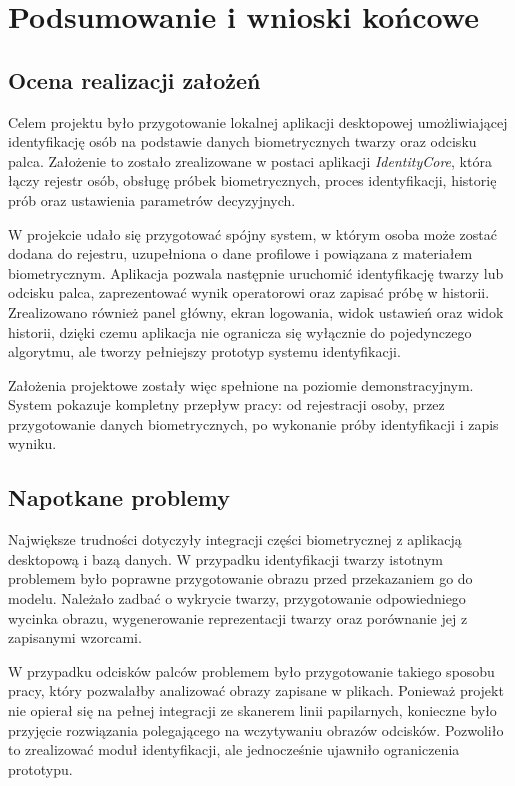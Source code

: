 \chapter{Podsumowanie i wnioski końcowe}
\label{chap:podsumowanie}

\section{Ocena realizacji założeń}

Celem projektu było przygotowanie lokalnej aplikacji desktopowej umożliwiającej identyfikację osób na podstawie danych biometrycznych twarzy oraz odcisku palca. Założenie to zostało zrealizowane w postaci aplikacji \textit{IdentityCore}, która łączy rejestr osób, obsługę próbek biometrycznych, proces identyfikacji, historię prób oraz ustawienia parametrów decyzyjnych.

W projekcie udało się przygotować spójny system, w którym osoba może zostać dodana do rejestru, uzupełniona o dane profilowe i powiązana z materiałem biometrycznym. Aplikacja pozwala następnie uruchomić identyfikację twarzy lub odcisku palca, zaprezentować wynik operatorowi oraz zapisać próbę w historii. Zrealizowano również panel główny, ekran logowania, widok ustawień oraz widok historii, dzięki czemu aplikacja nie ogranicza się wyłącznie do pojedynczego algorytmu, ale tworzy pełniejszy prototyp systemu identyfikacji.

Założenia projektowe zostały więc spełnione na poziomie demonstracyjnym. System pokazuje kompletny przepływ pracy: od rejestracji osoby, przez przygotowanie danych biometrycznych, po wykonanie próby identyfikacji i zapis wyniku.

\section{Napotkane problemy}

Największe trudności dotyczyły integracji części biometrycznej z aplikacją desktopową i bazą danych. W przypadku identyfikacji twarzy istotnym problemem było poprawne przygotowanie obrazu przed przekazaniem go do modelu. Należało zadbać o wykrycie twarzy, przygotowanie odpowiedniego wycinka obrazu, wygenerowanie reprezentacji twarzy oraz porównanie jej z zapisanymi wzorcami.

W przypadku odcisków palców problemem było przygotowanie takiego sposobu pracy, który pozwalałby analizować obrazy zapisane w plikach. Ponieważ projekt nie opierał się na pełnej integracji ze skanerem linii papilarnych, konieczne było przyjęcie rozwiązania polegającego na wczytywaniu obrazów odcisków. Pozwoliło to zrealizować moduł identyfikacji, ale jednocześnie ujawniło ograniczenia prototypu.


